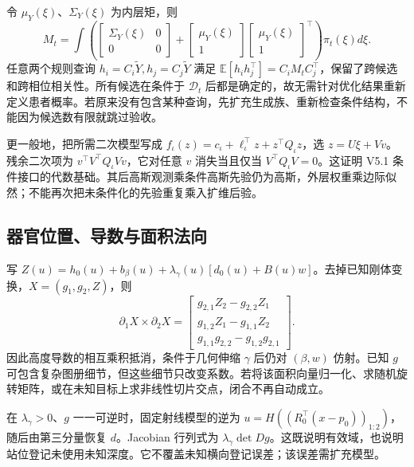 \documentclass[UTF8,11pt,a4paper,fontset=fandol]{ctexart}
\numberwithin{equation}{section}
\theoremstyle{definition}
\newcommand{\E}{\mathbb E}
\newcommand{\D}{\mathcal D}
\begin{document}
令 $\mu_Y(\xi)$、$\Sigma_Y(\xi)$ 为内层矩，则
\begin{equation}
 M_t=\int\left(
 \begin{bmatrix}\Sigma_Y(\xi)&0\\0&0\end{bmatrix}
 +\begin{bmatrix}\mu_Y(\xi)\\1\end{bmatrix}
  \begin{bmatrix}\mu_Y(\xi)\\1\end{bmatrix}^{\!\top}
 \right)\pi_t(\xi)d\xi .
 \label{eq:sharedmoment}
\end{equation}
任意两个规则查询 $h_i=C_i\widetilde Y,h_j=C_j\widetilde Y$ 满足
$\E[h_ih_j^\top]=C_iM_tC_j^\top$，保留了跨候选和跨相位相关性。所有候选在条件于 $\D_t$ 后都是确定的，故无需针对优化结果重新定义患者概率。若原来没有包含某种查询，先扩充生成族、重新检查条件结构，不能因为候选数有限就跳过验收。

更一般地，把所需二次模型写成 $f_\iota(z)=c_\iota+\ell_\iota^\top z+z^\top Q_\iota z$，选 $z=U\xi+Vv$。残余二次项为 $v^\top V^\top Q_\iota Vv$，它对任意 $v$ 消失当且仅当 $V^\top Q_\iota V=0$。这证明 V5.1 条件接口的代数基础。其后高斯观测乘条件高斯先验仍为高斯，外层权重乘边际似然；不能再次把未条件化的先验重复乘入扩维后验。

\subsection{器官位置、导数与面积法向}
写 $Z(u)=h_0(u)+b_\beta(u)+\lambda_\gamma(u)[d_0(u)+B(u)w]$。去掉已知刚体变换，$X=(g_1,g_2,Z)$，则
\begin{equation}
 \partial_1X\times\partial_2X=
 \begin{bmatrix}
 g_{2,1}Z_2-g_{2,2}Z_1\\
 g_{1,2}Z_1-g_{1,1}Z_2\\
 g_{1,1}g_{2,2}-g_{1,2}g_{2,1}
 \end{bmatrix}.
 \label{eq:normalproof}
\end{equation}
因此高度导数的相互乘积抵消，条件于几何伸缩 $\gamma$ 后仍对 $(\beta,w)$ 仿射。已知 $g$ 可包含复杂图册细节，但这些细节只改变系数。若将该面积向量归一化、求随机旋转矩阵，或在未知目标上求非线性切片交点，闭合不再自动成立。

在 $\lambda_\gamma>0$、$g$ 一一可逆时，固定射线模型的逆为 $u=H((R_0^\top(x-p_0))_{1:2})$，随后由第三分量恢复 $d$。Jacobian 行列式为 $\lambda_\gamma\det Dg$。这既说明有效域，也说明站位登记未使用未知深度。它不覆盖未知横向登记误差；该误差需扩充模型。
\end{document}

